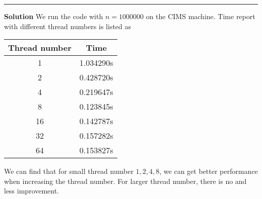 \documentclass[12pt]{article}
\begin{document}
\begin{enumerate}
\begin{itemize}
     \noindent\rule[0.5ex]{\linewidth}{1pt}
     
     \textbf{Solution}
     We run the code with $n = 1000000$ on the CIMS machine. Time report with different thread numbers is listed as
     
         \vspace{6pt}
\begin{center}
\linespread{1.2}\selectfont
\begin{tabular}{|c|c|}
\hline
Thread number & Time  \\ \hline
1 & 1.034290s  \\ \hline
2 & 0.428720s  \\ \hline
4 & 0.219647s  \\ \hline
8 & 0.123845s  \\ \hline
16 & 0.142787s \\ \hline
32 & 0.157282s \\ \hline
64 & 0.153827s \\ \hline
\end{tabular}
\end{center}

We can find that for small thread number $1, 2, 4, 8$, we can get better performance when increasing the thread number. For larger thread number, there is no and less improvement. 
      
     
     
    \end{itemize}
\end{enumerate}
\end{document}
